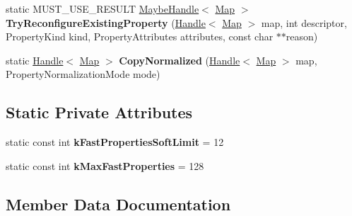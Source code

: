 \begin{DoxyCompactItemize}
\item 
static M\+U\+S\+T\+\_\+\+U\+S\+E\+\_\+\+R\+E\+S\+U\+LT \hyperlink{classv8_1_1internal_1_1_maybe_handle}{Maybe\+Handle}$<$ \hyperlink{classv8_1_1internal_1_1_map}{Map} $>$ {\bfseries Try\+Reconfigure\+Existing\+Property} (\hyperlink{classv8_1_1internal_1_1_handle}{Handle}$<$ \hyperlink{classv8_1_1internal_1_1_map}{Map} $>$ map, int descriptor, Property\+Kind kind, Property\+Attributes attributes, const char $\ast$$\ast$reason)\hypertarget{classv8_1_1internal_1_1_map_ab4c55057c03b03f9a18ac6e49724fa9a}{}\label{classv8_1_1internal_1_1_map_ab4c55057c03b03f9a18ac6e49724fa9a}

\item 
static \hyperlink{classv8_1_1internal_1_1_handle}{Handle}$<$ \hyperlink{classv8_1_1internal_1_1_map}{Map} $>$ {\bfseries Copy\+Normalized} (\hyperlink{classv8_1_1internal_1_1_handle}{Handle}$<$ \hyperlink{classv8_1_1internal_1_1_map}{Map} $>$ map, Property\+Normalization\+Mode mode)\hypertarget{classv8_1_1internal_1_1_map_a5b6faaada20d2342b31e829ad84a595b}{}\label{classv8_1_1internal_1_1_map_a5b6faaada20d2342b31e829ad84a595b}

\end{DoxyCompactItemize}
\subsection*{Static Private Attributes}
\begin{DoxyCompactItemize}
\item 
static const int {\bfseries k\+Fast\+Properties\+Soft\+Limit} = 12\hypertarget{classv8_1_1internal_1_1_map_a7cb47b01c100a0be4751080eb3ee19e8}{}\label{classv8_1_1internal_1_1_map_a7cb47b01c100a0be4751080eb3ee19e8}

\item 
static const int {\bfseries k\+Max\+Fast\+Properties} = 128\hypertarget{classv8_1_1internal_1_1_map_abc33461e415973cf31cc30d36b447301}{}\label{classv8_1_1internal_1_1_map_abc33461e415973cf31cc30d36b447301}

\end{DoxyCompactItemize}


\subsection{Member Data Documentation}
